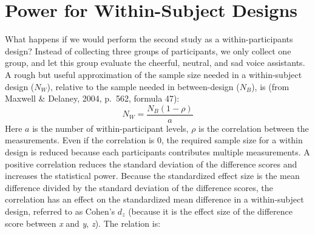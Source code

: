 \documentclass[
  ,jou,floatsintext]{apa6}
\begin{document}
\hypertarget{power-for-within-subject-designs}{%
\section{Power for Within-Subject Designs}\label{power-for-within-subject-designs}}

What happens if we would perform the second study as a within-participants design?
Instead of collecting three groups of participants, we only collect one group, and let this group evaluate the cheerful, neutral, and sad voice assistants.
A rough but useful approximation of the sample size needed in a within-subject design (\(N_W\)), relative to the sample needed in between-design (\(N_B\)), is (from Maxwell \& Delaney, 2004, p.~562, formula 47):
\begin{equation}
N_{W}=\frac{N_{B}(1-\rho)}{a} \label{eq:within-n}
\end{equation}
Here \(a\) is the number of within-participant levels, \(\rho\) is the correlation between the measurements.
Even if the correlation is 0, the required sample size for a within design is reduced because each participants contributes multiple measurements.
A positive correlation reduces the standard deviation of the difference scores and increases the statistical power.
Because the standardized effect size is the mean difference divided by the standard deviation of the difference scores, the correlation has an effect on the standardized mean difference in a within-subject design, referred to as Cohen's \(d_z\) (because it is the effect size of the difference score between \emph{x} and \emph{y}, \emph{z}). The relation is:
\end{document}
